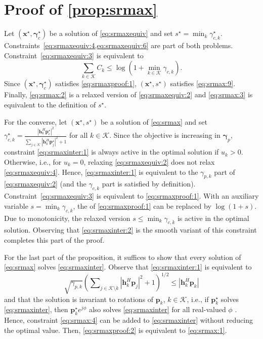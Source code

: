 \documentclass[a4paper,10pt,journal]{IEEEtran}
\let\vec\bm
\begin{document}
\appendices
\section{Proof of \cref{prop:srmax}} \label{proof:prop:srmax}
Let $(\vec x^\star, \vec \gamma_c^\star)$ be a solution of \cref{eq:srmaxequiv} and set $s^\star = \min_k \gamma_{c,k}^\star$. Constraints~\cref{eq:srmaxequiv:4,eq:srmaxequiv:6} are part of both problems. Constraint~\cref{eq:srmaxequiv:3} is equivalent to
	\begin{equation} \label{eq:srmaxproof:1}
		\sum_{k\in \mathcal{K}}C_{k}\leq \log(1+ \min_{k\in\mathcal K} \gamma_{c,k}).
	\end{equation}
	Since $(\vec x^\star, \vec \gamma_c^\star)$ satisfies \cref{eq:srmaxproof:1}, $(\vec x^\star, s^\star)$ satisfies \cref{eq:srmax:9}. Finally, \cref{eq:srmax:2} is a relaxed version of \cref{eq:srmaxequiv:2} and \cref{eq:srmax:3} is equivalent to the definition of $s^\star$.

	For the converse, let $(\vec x^\star, s^\star)$ be a solution of \cref{eq:srmax} and set $\gamma_{c,k}^\star = \frac{|{\vec{h}}_{k}^{H}\vec{p}_{c}^\star|^2}{\sum_{j\in\mathcal{K}}|\vec{h}_{k}^{H}\vec{p}_{j}^\star|^2+1}$ for all $k\in\mathcal K$.
	Since the objective is increasing in $\vec\gamma_p$, constraint \cref{eq:srmaxinter:1} is always active in the optimal solution if $u_k > 0$. Otherwise, i.e., for $u_k = 0$, relaxing \cref{eq:srmaxequiv:2} does not relax \cref{eq:srmaxequiv:4}. Hence, \cref{eq:srmaxinter:1} is equivalent to the $\gamma_{p,k}$ part of \cref{eq:srmaxequiv:2} (and the $\gamma_{c,k}$ part is satisfied by definition).
	Constraint~\cref{eq:srmaxequiv:3} is equivalent to \cref{eq:srmaxproof:1}. With an auxiliary variable $s = \min_k \gamma_{c,k}$, the  of \cref{eq:srmaxproof:1} can be replaced by $\log(1+s)$. Due to monotonicity, the relaxed version $s \le \min_k \gamma_{c,k}$ is active in the optimal solution. Observing that \cref{eq:srmaxinter:2} is the smooth variant of this constraint completes this part of the proof.

	For the last part of the proposition, it suffices to show that every solution of \cref{eq:srmax} solves \cref{eq:srmaxinter}.
Observe that \cref{eq:srmaxinter:1} is equivalent to
\begin{equation} \label{eq:srmaxproof:2}
	\sqrt{\gamma_{p,k}} \left( \sum\nolimits_{j\in\mathcal{K}\setminus k}|\vec{h}_{k}^{H}\vec{p}_{j}|^2+1 \right)^{1/2} \le |{\vec{h}}_{k}^{H}\vec{p}_{k}|
\end{equation}
and that the solution is invariant to rotations of $\vec p_k$, $k\in\mathcal K$, i.e., if $\vec p_k^\star$ solves \cref{eq:srmaxinter}, then $\vec p_k^\star e^{j\phi}$ also solves \cref{eq:srmaxinter} for all real-valued $\phi$ \cite{Bengtsson1999}. Hence, constraint \cref{eq:srmax:4} can be added to \cref{eq:srmaxinter} without reducing the optimal value. Then, \cref{eq:srmaxproof:2} is equivalent to \cref{eq:srmax:1}.
\end{document}
